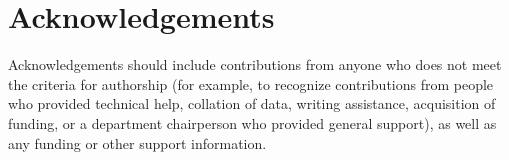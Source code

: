 \documentclass[num-refs]{wiley-article}
\begin{document}

\section*{Acknowledgements}
Acknowledgements should include contributions from anyone who does not meet the criteria for authorship (for example, to recognize contributions from people who provided technical help, collation of data, writing assistance, acquisition of funding, or a department chairperson who provided general support), as well as any funding or other support information.
\end{document}
